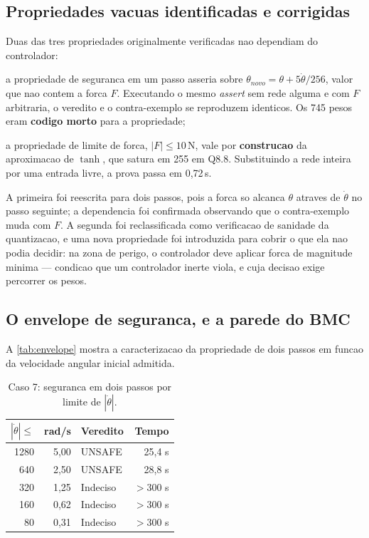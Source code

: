 \subsection{Propriedades vacuas identificadas e corrigidas}

Duas das tres propriedades originalmente verificadas nao dependiam do controlador:

\begin{alineas}
    \item a propriedade de seguranca em um passo asseria sobre
    $\theta_{novo} = \theta + 5\dot{\theta}/256$, valor que nao contem a forca
    $F$. Executando o mesmo \textit{assert} sem rede alguma e com $F$ arbitraria,
    o veredito e o contra-exemplo se reproduzem identicos. Os 745 pesos eram
    \textbf{codigo morto} para a propriedade;
    \item a propriedade de limite de forca, $|F| \leq 10$\,N, vale por
    \textbf{construcao} da aproximacao de $\tanh$, que satura em 255 em Q8.8.
    Substituindo a rede inteira por uma entrada livre, a prova passa em 0,72\,s.
\end{alineas}

A primeira foi reescrita para dois passos, pois a forca so alcanca $\theta$ atraves
de $\dot{\theta}$ no passo seguinte; a dependencia foi confirmada observando que o
contra-exemplo muda com $F$. A segunda foi reclassificada como verificacao de
sanidade da quantizacao, e uma nova propriedade foi introduzida para cobrir o que
ela nao podia decidir: na zona de perigo, o controlador deve aplicar forca de
magnitude minima --- condicao que um controlador inerte viola, e cuja decisao exige
percorrer os pesos.

\subsection{O envelope de seguranca, e a parede do BMC}

A \autoref{tab:envelope} mostra a caracterizacao da propriedade de dois passos em
funcao da velocidade angular inicial admitida.

\begin{table}[htb]
\caption{Caso 7: seguranca em dois passos por limite de $|\dot{\theta}|$.}
\label{tab:envelope}
\begin{center}
\begin{tabular}{r|r|l|r}
\hline
$|\dot{\theta}| \leq$ & \textbf{rad/s} & \textbf{Veredito} & \textbf{Tempo} \\
\hline
1280 & 5,00 & UNSAFE  & 25,4 s \\
 640 & 2,50 & UNSAFE  & 28,8 s \\
 320 & 1,25 & Indeciso & $>$300 s \\
 160 & 0,62 & Indeciso & $>$300 s \\
  80 & 0,31 & Indeciso & $>$300 s \\
\hline
\end{tabular}
\end{center}
\end{table}


